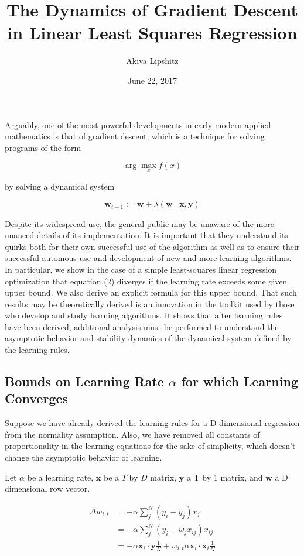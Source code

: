 \documentclass[]{article}
\title{The Dynamics of Gradient Descent in Linear Least Squares Regression}
\author{Akiva Lipshitz}
\date{June 22, 2017}
\begin{document}
\maketitle

Arguably, one of the most powerful developments in early modern applied
mathematics is that of gradient descent, which is a technique for
solving programs of the form

\[
\arg\max _x f(x)
\]

by solving a dynamical system

\[
\mathbf{w}_{t+1} := \mathbf{w}+\lambda(\mathbf{w}\mid \mathbf{x}, \mathbf{y})
\]

Despite its widespread use, the general public may be unaware of the
more nuanced details of its implementation. It is important that they
understand its quirks both for their own successful use of the algorithm
as well as to ensure their successful automous use and development of
new and more learning algorithms. In particular, we show in the case of
a simple least-squares linear regression optimization that equation (2)
diverges if the learning rate exceeds some given upper bound. We also
derive an explicit formula for this upper bound. That such results may
be theoretically derived is an innovation in the toolkit used by those
who develop and study learning algorithms. It shows that after learning
rules have been derived, additional analysis must be performed to
understand the asymptotic behavior and stability dynamics of the
dynamical system defined by the learning rules.

\subsection{\texorpdfstring{Bounds on Learning Rate \(\alpha\) for which
Learning
Converges}{Bounds on Learning Rate \alpha for which Learning Converges}}\label{bounds-on-learning-rate-alpha-for-which-learning-converges}

Suppose we have already derived the learning rules for a D dimensional
regression from the normality assumption. Also, we have removed all
constants of proportionality in the learning equations for the sake of
simplicity, which doesn't change the asymptotic behavior of learning.

Let \(\alpha\) be a learning rate, \(\mathbf{x}\) be a \(T\) by \(D\)
matrix, \(\mathbf{y}\) a T by 1 matrix, and \(\mathbf{w}\) a D
dimensional row vector.

\begin{align}
\Delta w_{i,t} &= -\alpha \sum\limits^N_j (y_i-\hat{y}_j)x_j \\
&= -\alpha \sum\limits^N_j (y_i-w_jx_{ij})x_{ij}\\
&= -\alpha \mathbf{x}_i\cdot\mathbf{y}\frac{1}{N} + w_{i,t}\alpha \mathbf{x}_i\cdot\mathbf{x}_i\frac{1}{N}
\end{align}
\end{document}
